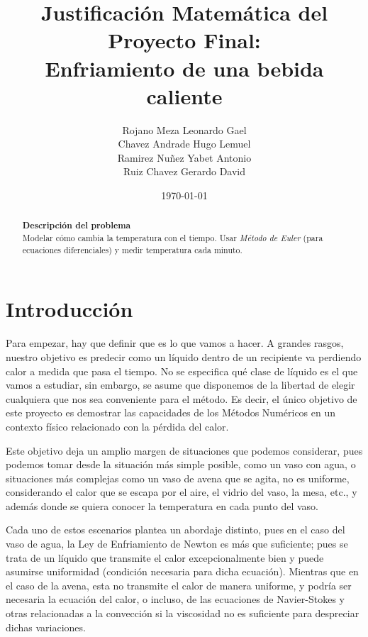 \documentclass[letter]{tufte-handout} %
\title{Justificación Matemática del Proyecto Final: \\Enfriamiento de una bebida caliente}
\author{\small Rojano Meza Leonardo Gael\\Chavez Andrade Hugo Lemuel\\Ramirez Nuñez Yabet Antonio\\Ruiz Chavez Gerardo David}
\date{\today}
\begin{document}
\maketitle %


\begin{abstract}
	\textbf{Descripción del problema}\\
	Modelar cómo cambia la temperatura con el tiempo. Usar \textit{Método de Euler} (para
	ecuaciones diferenciales) y medir temperatura cada minuto.
\end{abstract}


\section{Introducción} \label{sec:firstdraft}
Para empezar, hay que definir que es lo que vamos a hacer. A grandes rasgos, nuestro objetivo es
predecir como un líquido dentro de un recipiente va perdiendo calor a medida que pasa el tiempo.
No se especifica qué clase de líquido es el que vamos a estudiar, sin embargo, se asume que
disponemos de la libertad de elegir cualquiera que nos sea conveniente para el método. Es decir,
el único objetivo de este proyecto es demostrar las capacidades de los Métodos Numéricos en un
contexto físico relacionado con la pérdida del calor.

Este objetivo deja un amplio margen de situaciones que podemos considerar, pues
podemos tomar desde la situación más simple posible, como un vaso con agua, o situaciones
más complejas como un vaso de avena que se agita, no es uniforme, considerando
el calor que se escapa por el aire, el vidrio del vaso, la mesa, etc., y además donde
se quiera conocer la temperatura en cada punto del vaso.

Cada uno de estos escenarios plantea un abordaje distinto, pues en el caso del vaso de agua, la Ley
de Enfriamiento de Newton es más que suficiente; pues se trata de un líquido que transmite el calor
excepcionalmente bien y puede asumirse uniformidad (condición necesaria para dicha ecuación).
Mientras que en el caso de la avena, esta no transmite el calor de manera uniforme, y podría ser
necesaria la ecuación del calor, o incluso, de las ecuaciones de Navier-Stokes y otras relacionadas
a la convección si la viscosidad no es suficiente para despreciar dichas variaciones.
\end{document}
